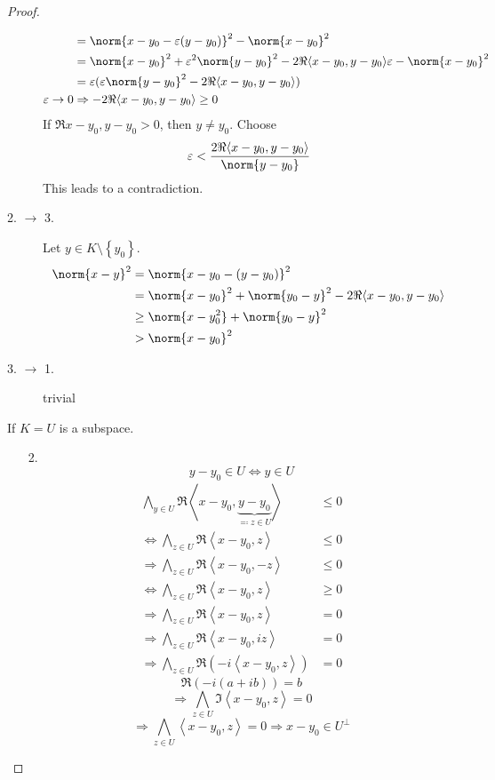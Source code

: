 \documentclass[a4paper,landscape,twocolumn]{article}
\newcommand\set[1]{\left\{#1\right\}}
\newcommand\functional[1]{\left\langle{#1}\right\rangle}
\DeclarePairedDelimiter\norm\lVert\rVert
\begin{document}
\begin{proof}
\begin{description}
\begin{align*}
          &= \norm{x - y_0 - \varepsilon (y - y_0)}^2 - \norm{x - y_0}^2 \\
          &= \norm{x - y_0}^2 + \varepsilon^2 \norm{y - y_0}^2 - 2 \Re{\functional{x - y_0, y - y_0}} \varepsilon - \norm{x - y_0}^2 \\
          &= \varepsilon(\varepsilon \norm{y - y_0}^2 - 2 \Re{\functional{x - y_0, y - y_0}}) \\
        \varepsilon \to 0 & \Rightarrow -2 \Re{\functional{x - y_0, y - y_0}} \geq 0
      \end{align*}
      If $\Re{x - y_0, y - y_0} > 0$, then $y \neq y_0$. Choose
      \[ \varepsilon < \frac{2\Re{\functional{x - y_0, y - y_0}}}{\norm{y - y_0}} \]
      This leads to a contradiction.
    \item[2. $\rightarrow$ 3.]
      Let $y \in K \setminus \set{y_0}$.
      \begin{align*}
        \norm{x - y}^2 &= \norm{x - y_0 - (y - y_0)}^2 \\
          &= \norm{x - y_0}^2 + \norm{y_0 - y}^2 - 2 \Re{\functional{x - y_0, y - y_0}} \\
          &\geq \norm{x - y_0^2} + \norm{y_0 - y}^2 \\
          &> \norm{x - y_0}^2
      \end{align*}
    \item[3. $\rightarrow$ 1.]
      trivial
  \end{description}

  If $K = U$ is a subspace.
  \begin{enumerate}
    \item[2.]
    \[ y - y_0 \in U \Leftrightarrow y \in U \]
      \begin{align*}
        \bigwedge_{y \in U} \Re{\functional{x - y_0, \underbrace{y - y_0}_{\eqqcolon z \in U}}} &\leq 0 \\
        \Leftrightarrow \bigwedge_{z \in U} \Re{\functional{x - y_0, z}} &\leq 0 \\
        \Rightarrow \bigwedge_{z \in U} \Re{\functional{x - y_0, -z}} &\leq 0 \\
        \Leftrightarrow \bigwedge_{z \in U} \Re{\functional{x - y_0, z}} &\geq 0 \\
        \Rightarrow \bigwedge_{z \in U} \Re{\functional{x - y_0, z}} &= 0 \\
        \Rightarrow \bigwedge_{z \in U} \Re{\functional{x - y_0, iz}} &= 0 \\
        \Rightarrow \bigwedge_{z \in U} \Re{(-i \functional{x - y_0, z})} &= 0
      \end{align*}
      \[ \Re(-i (a + ib)) = b \]
      \[ \Rightarrow \bigwedge_{z \in U} \Im\functional{x - y_0, z} = 0 \]
      \[ \Rightarrow \bigwedge_{z \in U} \functional{x - y_0, z} = 0 \Rightarrow x - y_0 \in U^\bot \]
  \end{enumerate}
\end{proof}
\end{document}
